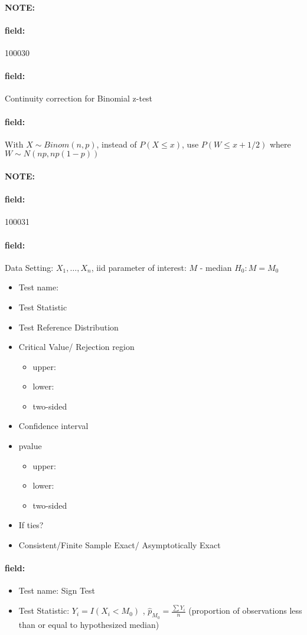 \documentclass[12pt]{article}
\newenvironment{note}{\paragraph{NOTE:}}{}
\newenvironment{field}{\paragraph{field:}}{}
\begin{document}
\begin{note} \begin{field} \tiny 100030 \end{field}
 \begin{field}
  Continuity correction for Binomial z-test
 \end{field}
 \begin{field}
  With $X \sim Binom(n,p)$, instead of $P(X \leq x)$, use $P(W \leq x + 1/2)$ where $W \sim N(np,np(1-p))$
 \end{field}
\end{note}


\begin{note} \begin{field} \tiny 100031 \end{field}
 \begin{field}
  Data Setting: $X_1, \ldots, X_n$, iid parameter of interest: $M$ - median $H_0: M = M_0$
  \begin{itemize}
   \item Test name:
   \item Test Statistic
   \item Test Reference Distribution
   \item Critical Value/ Rejection region
         \begin{itemize}
          \item upper:
          \item lower:
          \item two-sided
         \end{itemize}
   \item Confidence interval
   \item pvalue
         \begin{itemize}
          \item upper:
          \item lower:
          \item two-sided
         \end{itemize}
   \item If ties?
   \item Consistent/Finite Sample Exact/ Asymptotically Exact
  \end{itemize}
 \end{field}
 \begin{field}
  \begin{itemize}
   \item Test name: Sign Test
   \item Test Statistic: $Y_i = I(X_i < M_0)$ , $\hat{p}_{M_0} = \frac{\sum Y_i}{n}$ (proportion of observations less than or equal to hypothesized median)

\end{itemize}
\end{field}
\end{note}
\end{document}
